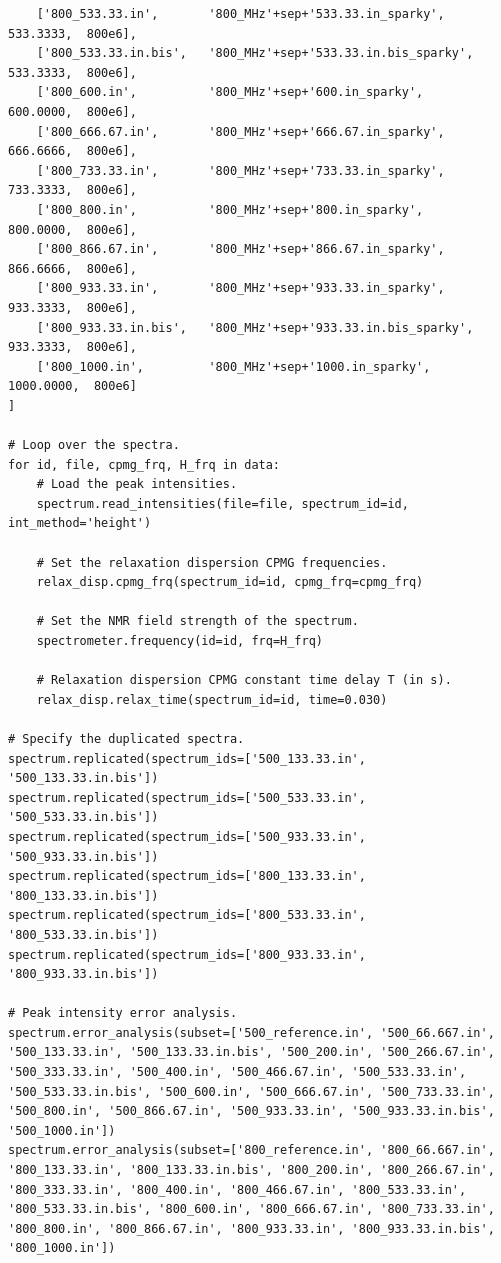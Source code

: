 \begin{lstlisting}
    ['800_533.33.in',       '800_MHz'+sep+'533.33.in_sparky',          533.3333,  800e6],
    ['800_533.33.in.bis',   '800_MHz'+sep+'533.33.in.bis_sparky',      533.3333,  800e6],
    ['800_600.in',          '800_MHz'+sep+'600.in_sparky',             600.0000,  800e6],
    ['800_666.67.in',       '800_MHz'+sep+'666.67.in_sparky',          666.6666,  800e6],
    ['800_733.33.in',       '800_MHz'+sep+'733.33.in_sparky',          733.3333,  800e6],
    ['800_800.in',          '800_MHz'+sep+'800.in_sparky',             800.0000,  800e6],
    ['800_866.67.in',       '800_MHz'+sep+'866.67.in_sparky',          866.6666,  800e6],
    ['800_933.33.in',       '800_MHz'+sep+'933.33.in_sparky',          933.3333,  800e6],
    ['800_933.33.in.bis',   '800_MHz'+sep+'933.33.in.bis_sparky',      933.3333,  800e6],
    ['800_1000.in',         '800_MHz'+sep+'1000.in_sparky',           1000.0000,  800e6]
]

# Loop over the spectra.
for id, file, cpmg_frq, H_frq in data:
    # Load the peak intensities.
    spectrum.read_intensities(file=file, spectrum_id=id, int_method='height')

    # Set the relaxation dispersion CPMG frequencies.
    relax_disp.cpmg_frq(spectrum_id=id, cpmg_frq=cpmg_frq)

    # Set the NMR field strength of the spectrum.
    spectrometer.frequency(id=id, frq=H_frq)

    # Relaxation dispersion CPMG constant time delay T (in s).
    relax_disp.relax_time(spectrum_id=id, time=0.030)

# Specify the duplicated spectra.
spectrum.replicated(spectrum_ids=['500_133.33.in', '500_133.33.in.bis'])
spectrum.replicated(spectrum_ids=['500_533.33.in', '500_533.33.in.bis'])
spectrum.replicated(spectrum_ids=['500_933.33.in', '500_933.33.in.bis'])
spectrum.replicated(spectrum_ids=['800_133.33.in', '800_133.33.in.bis'])
spectrum.replicated(spectrum_ids=['800_533.33.in', '800_533.33.in.bis'])
spectrum.replicated(spectrum_ids=['800_933.33.in', '800_933.33.in.bis'])

# Peak intensity error analysis.
spectrum.error_analysis(subset=['500_reference.in', '500_66.667.in', '500_133.33.in', '500_133.33.in.bis', '500_200.in', '500_266.67.in', '500_333.33.in', '500_400.in', '500_466.67.in', '500_533.33.in', '500_533.33.in.bis', '500_600.in', '500_666.67.in', '500_733.33.in', '500_800.in', '500_866.67.in', '500_933.33.in', '500_933.33.in.bis', '500_1000.in'])
spectrum.error_analysis(subset=['800_reference.in', '800_66.667.in', '800_133.33.in', '800_133.33.in.bis', '800_200.in', '800_266.67.in', '800_333.33.in', '800_400.in', '800_466.67.in', '800_533.33.in', '800_533.33.in.bis', '800_600.in', '800_666.67.in', '800_733.33.in', '800_800.in', '800_866.67.in', '800_933.33.in', '800_933.33.in.bis', '800_1000.in'])


\end{lstlisting}
